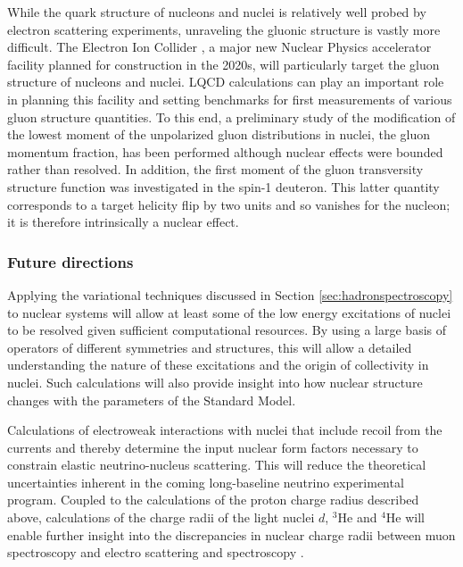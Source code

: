 While the quark structure of nucleons and nuclei is relatively well probed by electron scattering experiments, unraveling the gluonic structure is vastly more difficult. The Electron Ion Collider \cite{Accardi:2012qut}, a major new Nuclear Physics accelerator facility planned for construction in the 2020s, will particularly target the gluon structure of nucleons and nuclei. LQCD calculations can play an important role in planning this facility and setting benchmarks for first measurements of various gluon structure quantities. To this end, a preliminary study of the modification of the lowest moment of the unpolarized  gluon distributions in nuclei, the gluon momentum fraction, has been performed \cite{Winter:2017bfs}  although nuclear effects were bounded rather than resolved.   In addition, the first moment of the gluon transversity structure function was investigated in the spin-1 deuteron. This latter  quantity  corresponds to a target helicity flip by two units and so vanishes for the nucleon; it is therefore intrinsically a nuclear effect.




\subsubsection{Future directions}

Applying the variational techniques discussed in Section \ref{sec:hadronspectroscopy} to nuclear systems will allow at least some of the low energy excitations of nuclei to be resolved given sufficient computational resources. By using a large basis of operators of different symmetries and structures, this will allow a detailed understanding the nature of these excitations and the origin of collectivity in nuclei. Such calculations will also provide insight into how nuclear structure changes with the parameters of the Standard Model.

Calculations of electroweak interactions with nuclei that include recoil from the currents and thereby determine the input nuclear form factors necessary to constrain  elastic  neutrino-nucleus scattering. This will reduce the theoretical uncertainties inherent in the coming long-baseline neutrino experimental program. Coupled to the calculations of the proton charge radius described above, calculations of the charge radii of the light nuclei $d$, $^3$He and $^4$He  will enable further insight into the discrepancies in nuclear charge radii between muon spectroscopy and electro scattering and spectroscopy \cite{}.


